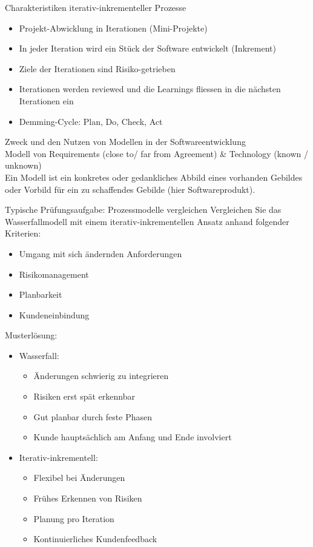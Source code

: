 \begin{concept}{Charakteristiken iterativ-inkrementeller Prozesse}
\begin{itemize}
    \item Projekt-Abwicklung in Iterationen (Mini-Projekte)
    \item In jeder Iteration wird ein Stück der Software entwickelt (Inkrement)
    \item Ziele der Iterationen sind Risiko-getrieben
    \item Iterationen werden reviewed und die Learnings fliessen in die nächsten Iterationen ein
    \item Demming-Cycle: Plan, Do, Check, Act
\end{itemize}
\end{concept}

\begin{concept}{Zweck und den Nutzen von Modellen in der Softwareentwicklung}\\
Modell von Requirements (close to/ far from Agreement) \& Technology (known / unknown)\\
Ein Modell ist ein konkretes oder gedankliches Abbild eines vorhanden Gebildes oder Vorbild für ein zu schaffendes Gebilde (hier Softwareprodukt).
\end{concept}

\begin{example2}{Typische Prüfungsaufgabe: Prozessmodelle vergleichen}
Vergleichen Sie das Wasserfallmodell mit einem iterativ-inkrementellen Ansatz anhand folgender Kriterien:
\begin{itemize}
    \item Umgang mit sich ändernden Anforderungen
    \item Risikomanagement
    \item Planbarkeit
    \item Kundeneinbindung
\end{itemize}

Musterlösung:
\begin{itemize}
    \item Wasserfall:
    \begin{itemize}
        \item Änderungen schwierig zu integrieren
        \item Risiken erst spät erkennbar
        \item Gut planbar durch feste Phasen
        \item Kunde hauptsächlich am Anfang und Ende involviert
    \end{itemize}
    \item Iterativ-inkrementell:
    \begin{itemize}
        \item Flexibel bei Änderungen
        \item Frühes Erkennen von Risiken
        \item Planung pro Iteration
        \item Kontinuierliches Kundenfeedback
    \end{itemize}
\end{itemize}
\end{example2}

